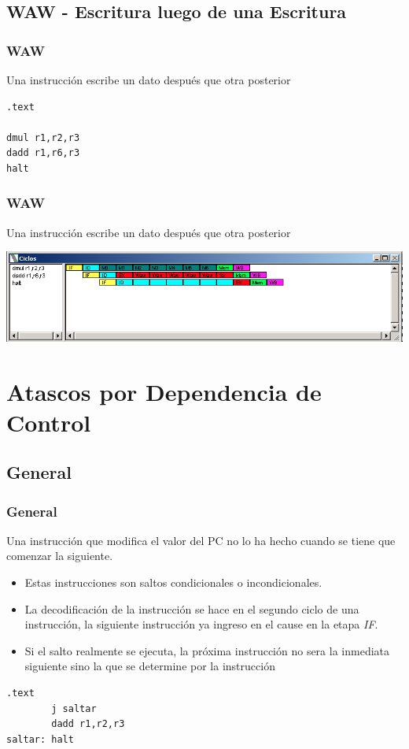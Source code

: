 \documentclass{beamer}
\begin{document}
\subsection{WAW - Escritura luego de una Escritura}
\begin{frame}[fragile]
\frametitle{WAW}
Una instrucción escribe un dato después que otra posterior
\begin{block}{}
\begin{lstlisting}[language=WinMIPS64,basicstyle=\ttfamily,keywordstyle=\color{blue}]
.text

dmul r1,r2,r3
dadd r1,r6,r3
halt
\end{lstlisting}
\end{block}

\end{frame}


\begin{frame}[fragile]
\frametitle{WAW}
Una instrucción escribe un dato después que otra posterior
\begin{block}{}
\includegraphics[scale=0.45]{waw.png}
\end{block}
\end{frame}

\section{Atascos por Dependencia de Control}
\subsection{General}
\begin{frame}[fragile]
\frametitle{General}
Una instrucción que modifica el valor del PC no lo ha hecho cuando se tiene que comenzar la siguiente.
\begin{itemize}
\item Estas instrucciones son saltos condicionales o incondicionales.
\item La decodificación de la instrucción se hace en el segundo ciclo de una instrucción, la siguiente instrucción ya ingreso en el cause en la etapa \emph{IF}.
\item Si el salto realmente se ejecuta, la próxima instrucción no sera la inmediata siguiente sino la que se determine por la instrucción
\end{itemize}
\begin{block}{}
\begin{lstlisting}[language=WinMIPS64,basicstyle=\ttfamily,keywordstyle=\color{blue}]
        .text
        j saltar
        dadd r1,r2,r3
saltar: halt
\end{lstlisting}
\end{block}
\end{frame}
\end{document}
